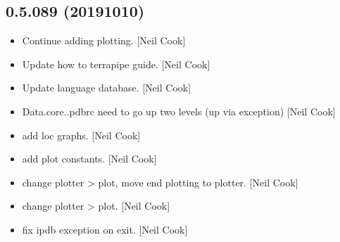 \documentclass[a4paper,10pt,english]{report}
\begin{document}
\subsection{0.5.089 (2019\sphinxhyphen{}10\sphinxhyphen{}10)}
\label{\detokenize{misc/changelog:id73}}\begin{itemize}
\item {} 
Continue adding plotting. {[}Neil Cook{]}

\item {} 
Update how to terrapipe guide. {[}Neil Cook{]}

\item {} 
Update language database. {[}Neil Cook{]}

\item {} 
Data.core..pdbrc \sphinxhyphen{} need to go up two levels (up via exception) {[}Neil
Cook{]}

\item {} 
 \sphinxhyphen{} add loc graphs. {[}Neil
Cook{]}

\item {} 
 \sphinxhyphen{} add plot constants. {[}Neil
Cook{]}

\item {} 
 \sphinxhyphen{} change plotter \textendash{}\textgreater{} plot, move end plotting
to plotter. {[}Neil Cook{]}

\item {} 
 \sphinxhyphen{} change plotter \textendash{}\textgreater{} plot. {[}Neil Cook{]}

\item {} 
 \sphinxhyphen{} fix ipdb exception on exit. {[}Neil
Cook{]}

\end{itemize}
\end{document}
